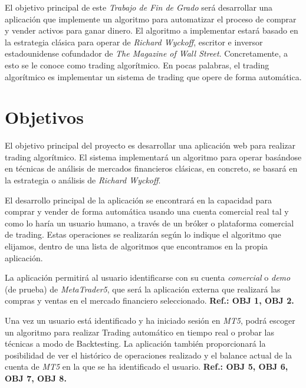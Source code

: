 El objetivo principal de este \textit{Trabajo de Fin de Grado} será desarrollar una aplicación que implemente un algoritmo para automatizar el proceso de comprar y vender activos para ganar dinero. El algoritmo a implementar estará basado en la estrategia clásica para operar de \textit{Richard Wyckoff}, escritor e inversor estadounidense cofundador de \textit{The Magazine of Wall Street}. Concretamente, a esto se le conoce como trading algorítmico. En pocas palabras, el trading algorítmico es implementar un sistema de trading que opere de forma automática. \newline

	

\section{Objetivos}

El objetivo principal del proyecto es desarrollar una aplicación web para realizar trading algorítmico. El sistema implementará un algoritmo para operar basándose en técnicas de análisis de mercados financieros clásicas, en concreto, se basará en la estrategia o análisis de \textit{Richard Wyckoff}. \newline

El desarrollo principal de la aplicación se encontrará en la capacidad para comprar y vender de forma automática usando una cuenta comercial real tal y como lo haría un usuario humano, a través de un bróker o plataforma comercial de trading. Estas operaciones se realizarán según lo indique el algoritmo que elijamos, dentro de una lista de algoritmos que encontramos en la propia aplicación. \newline

La aplicación permitirá al usuario identificarse con su cuenta \textit{comercial} o \textit{demo} (de prueba) de \textit{MetaTrader5}, que será la aplicación externa que realizará las compras y ventas en el mercado financiero seleccionado. \textbf{Ref.: OBJ 1, OBJ 2.} \newline

Una vez un usuario está identificado y ha iniciado sesión en \textit{MT5}, podrá escoger un algoritmo para realizar Trading automático en tiempo real o probar las técnicas a modo de Backtesting. La aplicación también proporcionará la posibilidad de ver el histórico de operaciones realizado y el balance actual de la cuenta de \textit{MT5} en la que se ha identificado el usuario. \textbf{Ref.: OBJ 5, OBJ 6, OBJ 7, OBJ 8.} \newline

